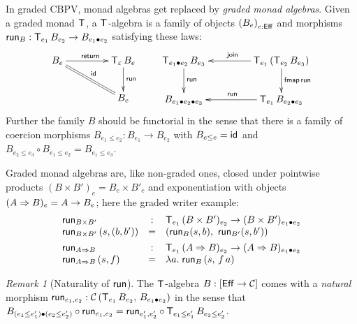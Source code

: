 \documentclass[acmsmall,review,anonymous]{acmart}\settopmatter{printfolios=true,printccs=false,printacmref=false}
\theoremstyle{remark}
\newtheorem{remark}{Remark}
\begin{document}
In graded CBPV, monad algebras get replaced by \emph{graded monad
  algebras}.  Given a graded monad $\T$, a $\T$-algebra is a family of
objects $\left(B_e\right)_{e:\Eff}$ and morphisms
$\run[B] : \T[e_1]\,B_{e_2} \to B_{e_1 \bu e_2}$ satisfying these
laws:
\[
\xymatrix@C=10ex{
  B_e     \ar[r]^{\treturn} \ar@{=}[dr]^{\tid}
& \T[\Ge]\,B_e \ar[d]^{\run[]}
\\
& B_e
}
\qquad
\xymatrix@C=10ex{
  \T[e_1 \bu e_2]\,B_{e_3} \ar[d]^{\run[]}
& \T[e_1]\,(\T[e_2]\,B_{e_3}) \ar[l]_{\tjoin} \ar[d]^{\tfmap\,\run[]}
\\
  B_{e_1 \bu e_2 \bu e_3}
& \T[e_1]\,B_{e_2 \bu e_3} \ar[l]_{\run[]}
}
\]
Further the family $B$ should be functorial in the sense that there is
a family of coercion morphisms $B_{e_1 \leq e_2} : B_{e_1} \to B_{e_2}$ with
$B_{e \leq e} = \tid$ and $B_{e_2 \leq e_3} \circ B_{e_1 \leq e_2} =
B_{e_1 \leq e_3}$.

Graded monad algebras are, like non-graded ones, closed under
pointwise products $(B \times B')_e = B_e \times B'_e$ and
exponentiation with objects $(A \To B)_e = A \to B_e$;
here the graded writer example:
\[
\begin{array}{lcl}
  \run[B \times B'] & : & \T[e_1]\,(B \times B')_{e_2} \to (B \times
                          B')_{e_1 \bu e_2} \\
  \run[B \times B']\, (s,(b,b')) & = & (\run[B] (s,b),\
                                           \run[B'] (s,b'))
\\[1ex]
  \run[A \To B] & : & \T[e_1]\,(A \To B)_{e_2} \to (A \To B)_{e_1 \bu e_2} \\
  \run[A \To B]\, (s,f) & = & \lambda a.\; \run[B]\,(s,\,f\,a)
\\
\end{array}
\]

\begin{remark}[Naturality of $\trun$]
  The $\T$-algebra $B : [\Eff \to \CC]$ comes with a \emph{natural} morphism
  $\run[e_1,e_2] : \Hom {\T[e_1]\,B_{e_2}} {B_{e_1 \bu e_2}}$ in the
  sense that
  $B_{(e_1\leq e_1') \bu (e_2 \leq e_2')} \comp {\run[e_1,e_2]} =
  {\run[e_1',e_2']} \comp \T[e_1 \leq e_1']\,B_{e_2 \leq e_2'}$.
\end{remark}
\end{document}
